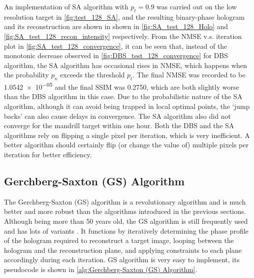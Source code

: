 An implementation of SA algorithm with $p_t = 0.9$ was carried out on the low resolution target in \cref{fig:test_128_SA}, and the resulting binary-phase hologram and its reconstruction are shown in shown in \cref{fig:SA_test_128_Holo} and \cref{fig:SA_test_128_recon_intensity} respectively. From the NMSE v.s. iteration plot in \cref{fig:SA_test_128_convergence}, it can be seen that, instead of the monotonic decrease observed in \cref{fig:DBS_test_128_convergence} for DBS algorithm, the SA algorithm has occasional rises in NMSE, which happens when the probability $p_n$ exceeds the threshold $p_t$. The final NMSE was recorded to be \num{1.0542e-05} and the final SSIM was 0.2750, which are both slightly worse than the DBS algorithm in this case. Due to the probabilistic nature of the SA algorithm, although it can avoid being trapped in local optimal points, the `jump backs' can also cause delays in convergence. The SA algorithm also did not converge for the mandrill target within one hour. Both the DBS and the SA algorithms rely on flipping a single pixel per iteration, which is very inefficient. A better algorithm should certainly flip (or change the value of) multiple pixels per iteration for better efficiency.


\subsection{Gerchberg-Saxton (GS) Algorithm}\label{sec:Gerchberg-Saxton (GS) Algorithm}
The Gerchberg-Saxton (GS) algorithm \cite{Gerchberg1972} is a revolutionary algorithm and is much better and more robust than the algorithms introduced in the previous sections. Although being more than 50 years old, the GS algorithm is still frequently used and has lots of variants \cite{Yang1994, WANG2017, Zhou2019}. It functions by iteratively determining the phase profile of the hologram required to reconstruct a target image, looping between the hologram and the reconstruction plane, and applying constraints to each plane accordingly during each iteration. GS algorithm is very easy to implement, its pseudocode is shown in \cref{alg:Gerchberg-Saxton (GS) Algorithm}.

